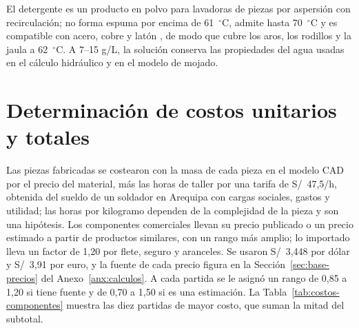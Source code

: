 El detergente es un producto en polvo para lavadoras de piezas por aspersión con recirculación; no forma espuma por encima de 61~$^\circ$C, admite hasta 70~$^\circ$C y es compatible con acero, cobre y latón \cite{zep36342}, de modo que cubre los aros, los rodillos y la jaula a 62~$^\circ$C. A 7--15 g/L, la solución conserva las propiedades del agua usadas en el cálculo hidráulico y en el modelo de mojado.

\section{Determinación de costos unitarios y totales}
\label{sec:costos-unitarios}

Las piezas fabricadas se costearon con la masa de cada pieza en el modelo CAD por el precio del material, más las horas de taller por una tarifa de S/~47,5/h, obtenida del sueldo de un soldador en Arequipa con cargas sociales, gastos y utilidad; las horas por kilogramo dependen de la complejidad de la pieza y son una hipótesis. Los componentes comerciales llevan su precio publicado o un precio estimado a partir de productos similares, con un rango más amplio; lo importado lleva un factor de 1,20 por flete, seguro y aranceles. Se usaron S/~3,448 por dólar y S/~3,91 por euro, y la fuente de cada precio figura en la Sección~\ref{sec:base-precios} del Anexo~\ref{anx:calculos}. A cada partida se le asignó un rango de 0,85 a 1,20 si tiene fuente y de 0,70 a 1,50 si es una estimación. La Tabla~\ref{tab:costos-componentes} muestra las diez partidas de mayor costo, que suman la mitad del subtotal.

